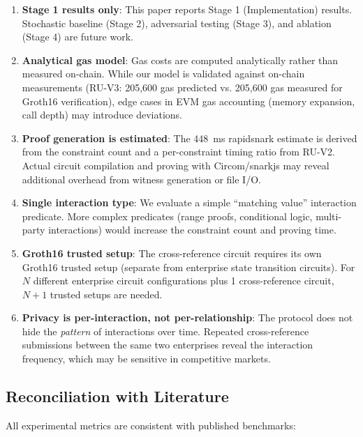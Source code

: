 \begin{enumerate}
\item \textbf{Stage 1 results only}: This paper reports Stage 1
  (Implementation) results. Stochastic baseline (Stage 2), adversarial
  testing (Stage 3), and ablation (Stage 4) are future work.

\item \textbf{Analytical gas model}: Gas costs are computed analytically
  rather than measured on-chain. While our model is validated against
  on-chain measurements (RU-V3: 205,600 gas predicted vs. 205,600 gas
  measured for Groth16 verification), edge cases in EVM gas accounting
  (memory expansion, call depth) may introduce deviations.

\item \textbf{Proof generation is estimated}: The 448~ms rapidsnark
  estimate is derived from the constraint count and a per-constraint
  timing ratio from RU-V2. Actual circuit compilation and proving with
  Circom/snarkjs may reveal additional overhead from witness generation
  or file I/O.

\item \textbf{Single interaction type}: We evaluate a simple
  ``matching value'' interaction predicate. More complex predicates
  (range proofs, conditional logic, multi-party interactions) would
  increase the constraint count and proving time.

\item \textbf{Groth16 trusted setup}: The cross-reference circuit
  requires its own Groth16 trusted setup (separate from enterprise
  state transition circuits). For $N$ different enterprise circuit
  configurations plus 1 cross-reference circuit, $N + 1$ trusted setups
  are needed.

\item \textbf{Privacy is per-interaction, not per-relationship}: The
  protocol does not hide the \emph{pattern} of interactions over time.
  Repeated cross-reference submissions between the same two enterprises
  reveal the interaction frequency, which may be sensitive in competitive
  markets.
\end{enumerate}

\subsection{Reconciliation with Literature}

All experimental metrics are consistent with published benchmarks:

